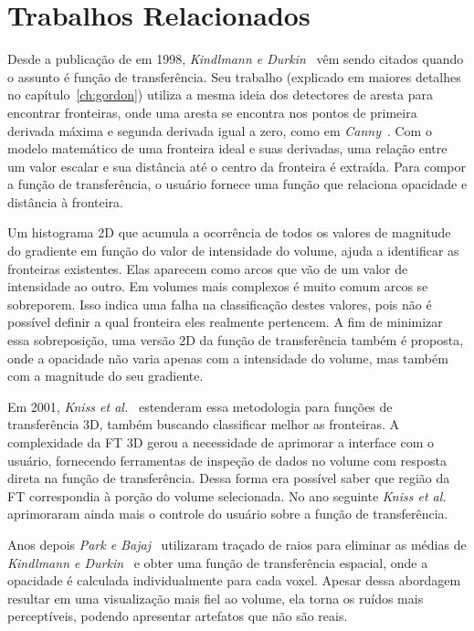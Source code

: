 
\chapter{Trabalhos Relacionados}
\label{ch:related}
	Desde a publicação de  em 1998, \textit{Kindlmann e Durkin}~\cite{gordon} vêm sendo citados quando o assunto é função de transferência. Seu trabalho (explicado em maiores detalhes no capítulo~\ref{ch:gordon}) utiliza a mesma ideia dos detectores de aresta para encontrar fronteiras, onde uma aresta se encontra nos pontos de primeira derivada máxima e segunda derivada igual a zero, como em \textit{Canny}~\cite{canny}. Com o modelo matemático de uma fronteira ideal e suas derivadas, uma relação entre um valor escalar e sua distância até o centro da fronteira é extraída. Para compor a função de transferência, o usuário fornece uma função que relaciona opacidade e distância à fronteira. 
	
	Um histograma 2D que acumula a ocorrência de todos os valores de magnitude do gradiente em função do valor de intensidade do volume, ajuda a identificar as fronteiras existentes. Elas aparecem como arcos que vão de um valor de intensidade ao outro. Em volumes mais complexos é muito comum arcos se sobreporem. Isso indica uma falha na classificação destes valores, pois não é possível definir a qual fronteira eles realmente pertencem. A fim de minimizar essa sobreposição, uma versão 2D da função de transferência também é proposta, onde a opacidade não varia apenas com a intensidade do volume, mas também com a magnitude do seu gradiente.
	
	Em 2001, \textit{Kniss et al.}~\cite{kniss1} estenderam essa metodologia para funções de transferência 3D, também buscando classificar melhor as fronteiras. A complexidade da FT 3D gerou a necessidade de aprimorar a interface com o usuário, fornecendo ferramentas de inspeção de dados no volume com resposta direta na função de transferência. Dessa forma era possível saber que região da FT correspondia à porção do volume selecionada. No ano seguinte \textit{Kniss et al.}~\cite{kniss2} aprimoraram ainda mais o controle do usuário sobre a função de transferência.
	
	Anos depois \textit{Park e Bajaj}~\cite{park} utilizaram traçado de raios para eliminar as médias de \textit{Kindlmann e Durkin}~\cite{gordon} e obter uma função de transferência espacial, onde a opacidade é calculada individualmente para cada voxel. Apesar dessa abordagem resultar em uma visualização mais fiel ao volume, ela torna os ruídos mais perceptíveis, podendo apresentar artefatos que não são reais.
	

